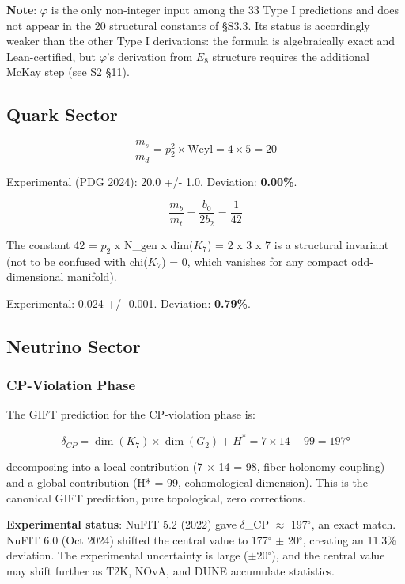 \documentclass[11pt,a4paper]{article}
\begin{document}
\textbf{Note}: \(\varphi\) is the only non-integer input among the 33
Type I predictions and does not appear in the 20 structural constants of
§S3.3. Its status is accordingly weaker than the other Type I
derivations: the formula is algebraically exact and Lean-certified, but
\(\varphi\)'s derivation from \(E_{8}\) structure requires the
additional McKay step (see S2 §11).

\subsection{Quark Sector}

\[\frac{m_s}{m_d} = p_2^2 \times \text{Weyl} = 4 \times 5 = 20\]

Experimental (PDG 2024): 20.0 +/- 1.0. Deviation: \textbf{0.00\%}.

\[\frac{m_b}{m_t} = \frac{b_0}{2b_2} = \frac{1}{42}\]

The constant 42 = \(p_{2}\) x N\_gen x dim(\(K_{7}\)) = 2 x 3 x 7 is a
structural invariant (not to be confused with chi(\(K_{7}\)) = 0, which
vanishes for any compact odd-dimensional manifold).

Experimental: 0.024 +/- 0.001. Deviation: \textbf{0.79\%}.

\subsection{Neutrino Sector}

\subsubsection{CP-Violation Phase}

The GIFT prediction for the CP-violation phase is:

\[\delta_{CP} = \dim(K_7) \times \dim(G_2) + H^* = 7 \times 14 + 99 = 197°\]

decomposing into a local contribution (7 \(\times\) 14 = 98,
fiber-holonomy coupling) and a global contribution (H* = 99,
cohomological dimension). This is the canonical GIFT prediction, pure
topological, zero corrections.

\textbf{Experimental status}: NuFIT 5.2 (2022) gave \(\delta\)\_CP
\(\approx\) 197\({}^{\circ}\), an exact match. NuFIT 6.0 (Oct 2024)
shifted the central value to 177\({}^{\circ}\) \(\pm\) 20\({}^{\circ}\),
creating an 11.3\% deviation. The experimental uncertainty is large
(\(\pm 20\)\({}^{\circ}\)), and the central value may shift further as
T2K, NOvA, and DUNE accumulate statistics.
\end{document}
